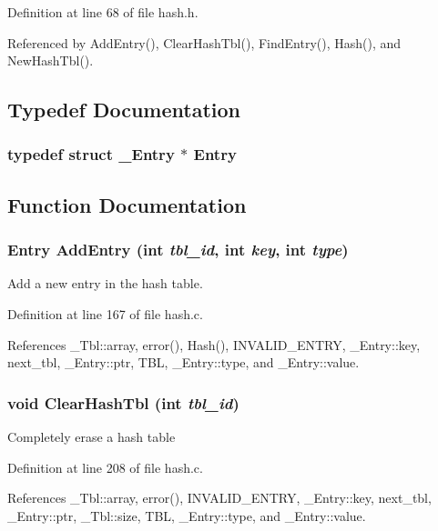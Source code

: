 Definition at line 68 of file hash.h.

Referenced by Add\-Entry(), Clear\-Hash\-Tbl(), Find\-Entry(), Hash(), and New\-Hash\-Tbl().

\subsection{Typedef Documentation}
\subsubsection{\setlength{\rightskip}{0pt plus 5cm}typedef struct \bf{\_\-Entry} $\ast$ \bf{Entry}}\label{hash_8h_c388c5691f37801cf2d7528db2548b26}




\subsection{Function Documentation}
\subsubsection{\setlength{\rightskip}{0pt plus 5cm}\bf{Entry} Add\-Entry (int {\em tbl\_\-id}, int {\em key}, int {\em type})}\label{hash_8h_823e73343ed3cc602ec5a47446d148ef}


Add a new entry in the hash table. 

Definition at line 167 of file hash.c.

References \_\-Tbl::array, error(), Hash(), INVALID\_\-ENTRY, \_\-Entry::key, next\_\-tbl, \_\-Entry::ptr, TBL, \_\-Entry::type, and \_\-Entry::value.
\subsubsection{\setlength{\rightskip}{0pt plus 5cm}void Clear\-Hash\-Tbl (int {\em tbl\_\-id})}\label{hash_8h_5004e15212d23633bcb473d8167f2ce9}


Completely erase a hash table 

Definition at line 208 of file hash.c.

References \_\-Tbl::array, error(), INVALID\_\-ENTRY, \_\-Entry::key, next\_\-tbl, \_\-Entry::ptr, \_\-Tbl::size, TBL, \_\-Entry::type, and \_\-Entry::value.
